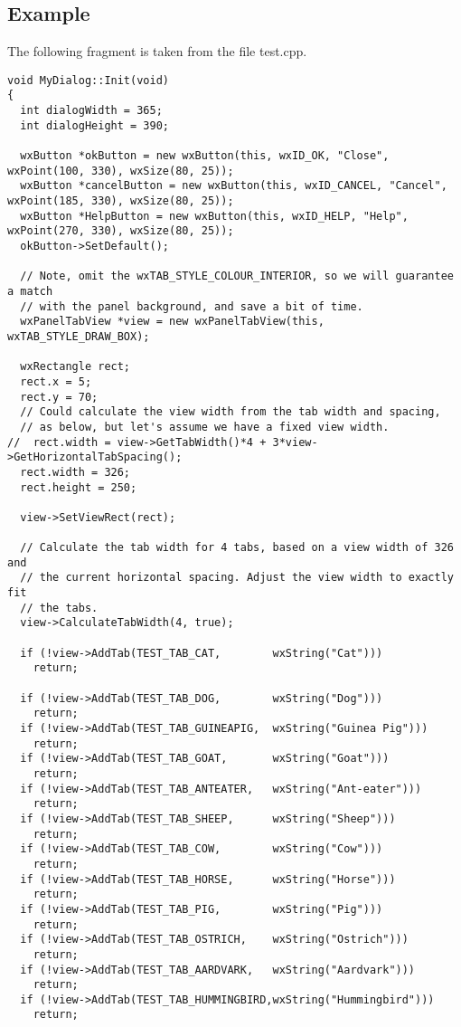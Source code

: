 \subsection{Example}

The following fragment is taken from the file test.cpp.

{\small
\begin{verbatim}
void MyDialog::Init(void)
{
  int dialogWidth = 365;
  int dialogHeight = 390;
  
  wxButton *okButton = new wxButton(this, wxID_OK, "Close", wxPoint(100, 330), wxSize(80, 25));
  wxButton *cancelButton = new wxButton(this, wxID_CANCEL, "Cancel", wxPoint(185, 330), wxSize(80, 25));
  wxButton *HelpButton = new wxButton(this, wxID_HELP, "Help", wxPoint(270, 330), wxSize(80, 25));
  okButton->SetDefault();

  // Note, omit the wxTAB_STYLE_COLOUR_INTERIOR, so we will guarantee a match
  // with the panel background, and save a bit of time.
  wxPanelTabView *view = new wxPanelTabView(this, wxTAB_STYLE_DRAW_BOX);

  wxRectangle rect;
  rect.x = 5;
  rect.y = 70;
  // Could calculate the view width from the tab width and spacing,
  // as below, but let's assume we have a fixed view width.
//  rect.width = view->GetTabWidth()*4 + 3*view->GetHorizontalTabSpacing();
  rect.width = 326;
  rect.height = 250;
  
  view->SetViewRect(rect);

  // Calculate the tab width for 4 tabs, based on a view width of 326 and
  // the current horizontal spacing. Adjust the view width to exactly fit
  // the tabs.
  view->CalculateTabWidth(4, true);

  if (!view->AddTab(TEST_TAB_CAT,        wxString("Cat")))
    return;

  if (!view->AddTab(TEST_TAB_DOG,        wxString("Dog")))
    return;
  if (!view->AddTab(TEST_TAB_GUINEAPIG,  wxString("Guinea Pig")))
    return;
  if (!view->AddTab(TEST_TAB_GOAT,       wxString("Goat")))
    return;
  if (!view->AddTab(TEST_TAB_ANTEATER,   wxString("Ant-eater")))
    return;
  if (!view->AddTab(TEST_TAB_SHEEP,      wxString("Sheep")))
    return;
  if (!view->AddTab(TEST_TAB_COW,        wxString("Cow")))
    return;
  if (!view->AddTab(TEST_TAB_HORSE,      wxString("Horse")))
    return;
  if (!view->AddTab(TEST_TAB_PIG,        wxString("Pig")))
    return;
  if (!view->AddTab(TEST_TAB_OSTRICH,    wxString("Ostrich")))
    return;
  if (!view->AddTab(TEST_TAB_AARDVARK,   wxString("Aardvark")))
    return;
  if (!view->AddTab(TEST_TAB_HUMMINGBIRD,wxString("Hummingbird")))
    return;
    

\end{verbatim}}

